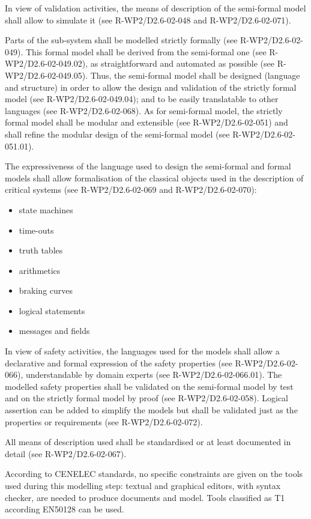In view of validation activities, the means of description of the semi-formal model shall allow to simulate it (see R-WP2/D2.6-02-048 and R-WP2/D2.6-02-071).

Parts of the sub-system shall be modelled strictly formally (see R-WP2/D2.6-02-049). This formal model shall be derived from the semi-formal one (see R-WP2/D2.6-02-049.02), as straightforward and automated as possible (see R-WP2/D2.6-02-049.05). Thus, the semi-formal model shall be designed (language and structure) in order to allow the design and validation of the strictly formal model (see R-WP2/D2.6-02-049.04); and to be easily translatable to other languages (see R-WP2/D2.6-02-068).
As for semi-formal model, the strictly formal model shall be modular and extensible (see R-WP2/D2.6-02-051) and shall refine the modular design of the semi-formal model (see R-WP2/D2.6-02-051.01).


The expressiveness of the language used to design the semi-formal and formal models shall allow formalisation of the classical objects used in the description of critical systems (see R-WP2/D2.6-02-069 and R-WP2/D2.6-02-070):

\begin{itemize}
\item state machines
\item time-outs
\item truth tables
\item arithmetics
\item braking curves
\item logical statements
\item messages and fields
\end{itemize}


In view of safety activities, the languages used for the models shall allow a declarative and formal expression of the safety properties (see R-WP2/D2.6-02-066), understandable by domain experts (see R-WP2/D2.6-02-066.01). The modelled safety properties shall be validated on the semi-formal model by test and on the strictly formal model by proof (see R-WP2/D2.6-02-058). Logical assertion can be added to simplify the models but shall be validated just as the properties or requirements (see R-WP2/D2.6-02-072).

All means of description used shall be standardised or at least documented in detail (see R-WP2/D2.6-02-067). 

According to  CENELEC standards, no specific constraints are given on the tools used during this modelling step: textual and graphical editors, with syntax checker, are needed to  produce documents and model. Tools classified as T1 according EN50128 can be used.


